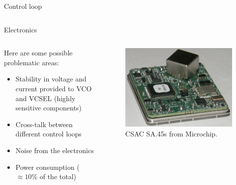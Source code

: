 \begin{frame}{Control loop}
\begin{columns}[c, onlytextwidth]
\begin{column}{0.4\textwidth}
        \end{column}

    \end{columns}


\end{frame}



\begin{frame}{Electronics}

    \begin{columns}[c, onlytextwidth]

        \begin{column}{0.6\textwidth}

            Here are some possible problematic areas:

            \begin{itemize}
                \item Stability in voltage and current provided to VCO and VCSEL (highly sensitive components)
                \item Cross-talk between different control loops
                \item Noise from the electronics
                \item Power consumption ($\approx 10\%$ of the total)
            \end{itemize}

        \end{column}

        \hfill

        \begin{column}{0.35\textwidth}

            \begin{figure}
                \centering
                \includegraphics[width=\textwidth]{img/electronics-CSCA-SA45s.png}
                \caption{CSAC SA.45s from Microchip.}
            \end{figure}


\end{column}
\end{columns}
\end{frame}
